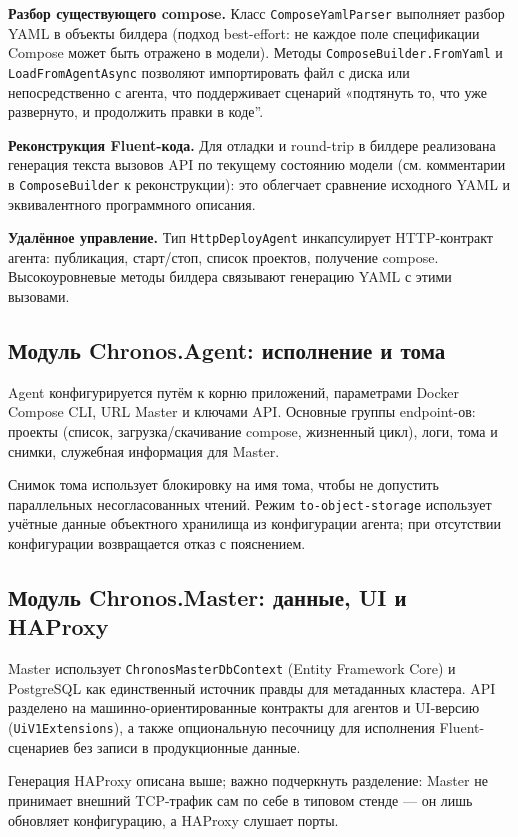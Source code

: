 \textbf{Разбор существующего compose.} Класс \texttt{ComposeYamlParser} выполняет разбор YAML в объекты билдера (подход best-effort: не каждое поле спецификации Compose может быть отражено в модели). Методы \texttt{ComposeBuilder.FromYaml} и \texttt{LoadFromAgentAsync} позволяют импортировать файл с диска или непосредственно с агента, что поддерживает сценарий «подтянуть то, что уже развернуто, и продолжить правки в коде''.

\textbf{Реконструкция Fluent-кода.} Для отладки и round-trip в билдере реализована генерация текста вызовов API по текущему состоянию модели (см. комментарии в \texttt{ComposeBuilder} к реконструкции): это облегчает сравнение исходного YAML и эквивалентного программного описания.

\textbf{Удалённое управление.} Тип \texttt{HttpDeployAgent} инкапсулирует HTTP-контракт агента: публикация, старт/стоп, список проектов, получение compose. Высокоуровневые методы билдера связывают генерацию YAML с этими вызовами.

\subsection{Модуль Chronos.Agent: исполнение и тома}

Agent конфигурируется путём к корню приложений, параметрами Docker Compose CLI, URL Master и ключами API. Основные группы endpoint-ов: проекты (список, загрузка/скачивание compose, жизненный цикл), логи, тома и снимки, служебная информация для Master.

Снимок тома использует блокировку на имя тома, чтобы не допустить параллельных несогласованных чтений. Режим \texttt{to-object-storage} использует учётные данные объектного хранилища из конфигурации агента; при отсутствии конфигурации возвращается отказ с пояснением.

\subsection{Модуль Chronos.Master: данные, UI и HAProxy}

Master использует \texttt{ChronosMasterDbContext} (Entity Framework Core) и PostgreSQL как единственный источник правды для метаданных кластера. API разделено на машинно-ориентированные контракты для агентов и UI-версию (\texttt{UiV1Extensions}), а также опциональную песочницу для исполнения Fluent-сценариев без записи в продукционные данные.

Генерация HAProxy описана выше; важно подчеркнуть разделение: Master не принимает внешний TCP-трафик сам по себе в типовом стенде --- он лишь обновляет конфигурацию, а HAProxy слушает порты.

